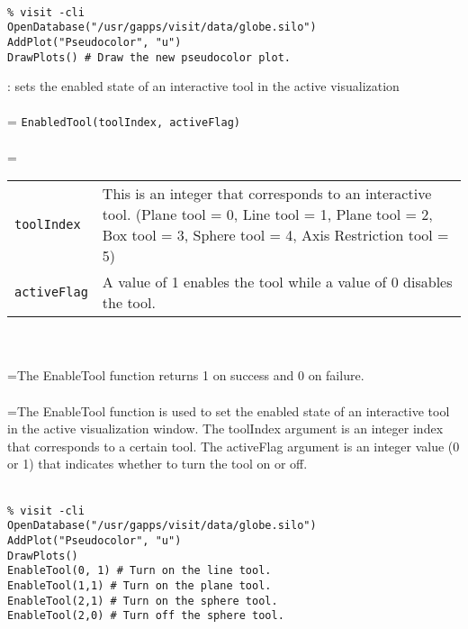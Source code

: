 \documentclass[10pt,a4paper]{report}
\begin{document}
\\[-6mm]
\begin{verbatim}% visit -cli
OpenDatabase("/usr/gapps/visit/data/globe.silo")
AddPlot("Pseudocolor", "u")
DrawPlots() # Draw the new pseudocolor plot.
\end{verbatim}
\newpage


{}
: sets the enabled state of an interactive tool in the active visualization\\[-3mm]

 \\ 
\hangindent=\parindent 
\verb!EnabledTool(toolIndex, activeFlag)!\\ [-3mm]

 \\ 
\hangindent=\parindent 
\begin{tabular}{lp{9cm}}
\verb!toolIndex! & This is an integer that corresponds to an interactive tool. (Plane tool = 0, Line tool = 1, Plane tool = 2, Box tool = 3, Sphere tool = 4, Axis Restriction tool = 5) \\
\verb!activeFlag! & A value of 1 enables the tool while a value of 0 disables the tool. \\
\end{tabular} \\[-2mm]


 \\ 
\hangindent=\parindent The EnableTool function returns 1 on success and 0 on failure. \\[-3mm] 

 \\ 
\hangindent=\parindent The EnableTool function is used to set the enabled state of an interactive tool in the active visualization window. The toolIndex argument is an integer index that corresponds to a certain tool. The activeFlag argument is an integer value (0 or 1) that indicates whether to turn the tool on or off. \\[-3mm] 

\\[-6mm]
\begin{verbatim}% visit -cli
OpenDatabase("/usr/gapps/visit/data/globe.silo")
AddPlot("Pseudocolor", "u")
DrawPlots()
EnableTool(0, 1) # Turn on the line tool.
EnableTool(1,1) # Turn on the plane tool.
EnableTool(2,1) # Turn on the sphere tool.
EnableTool(2,0) # Turn off the sphere tool.
\end{verbatim}
\newpage
\end{document}
